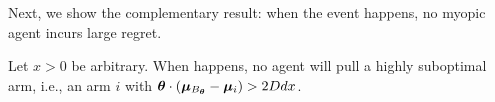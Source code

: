 Next, we show the complementary result:
when the event  happens, no myopic agent incurs large regret.

\begin{lemma} \label{lem:right-choice}
Let $x > 0$ be arbitrary.
When  happens,
no agent \AgV will pull a highly suboptimal arm, i.e., an arm $i$ with 
$\bm{\theta} \cdot (\bm{\mu}_{B_{\bm{\theta}}} - \bm{\mu}_{i}) > 2D d x$.
\end{lemma}



